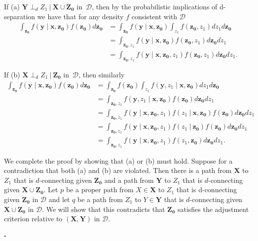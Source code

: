 \documentclass[11pt,a4paper]{article}
\newcommand{\bX}{\mathbf{X}}
\newcommand{\bY}{\mathbf{Y}}
\newcommand\given[1][]{\:#1\vert\:}
\newcommand{\dsepp}{\perp_{d}}
\newenvironment{proofof}[1][]{\begin{trivlist}
   \item[\hskip \labelsep {\bfseries Proof of #1.}]}{\hfill{}$\square$\end{trivlist}}
\newcommand{\g}[1][G]{\mathcal{#1}}
\begin{document}
\begin{proofof}[Lemma~\ref{lemma:zprime satisfies ac}]
If (a) $\mathbf{Y} \dsepp Z_1 \given \mathbf{X} \cup \mathbf{Z_0}$ in~$\g[D]$, then by the probabilistic implications of d-separation we have that for any density $f$ consistent with $\g[D]$
\begin{align}
\int_\mathbf{z_0} f(\mathbf{y} \mid \mathbf{x,z_0})f(\mathbf{z_0})d\mathbf{z_0} &= \int_\mathbf{z_0} f(\mathbf{y} \mid \mathbf{x,z_0})\int_{z_1}f(\mathbf{z_0},z_1)dz_1d\mathbf{z_0} \nonumber \\
&= \int_{\mathbf{z_0},z_1} f(\mathbf{y} \mid \mathbf{x,z_0}) f(\mathbf{z_0},z_1)d\mathbf{z_0}dz_1 \nonumber \\
&= \int_{\mathbf{z_0},z_1} f(\mathbf{y} \mid \mathbf{x,z_0},z_1)f(\mathbf{z_0},z_1)d\mathbf{z_0}dz_1. \nonumber 
\end{align}


If (b) $\mathbf{X} \dsepp Z_1 \given \mathbf{Z_0}$ in~$\g[D]$, then similarly 
\begin{align}
\int_\mathbf{z_0} f(\mathbf{y} \mid \mathbf{x,z_0})f(\mathbf{z_0})d\mathbf{z_0} &= \int_{\mathbf{z_0}}f(\mathbf{z_0})\int_{z_1} f(\mathbf{y},z_1 \mid \mathbf{x,z_0})dz_1d\mathbf{z_0} \nonumber \\
&= \int_{\mathbf{z_0},z_1} f(\mathbf{y},z_1 \mid \mathbf{x,z_0})f(\mathbf{z_0})d\mathbf{z_0}dz_1 \nonumber \\
&= \int_{\mathbf{z_0},z_1} f(\mathbf{y} \mid \mathbf{x,z_0},z_1)f(z_1 \given \mathbf{x,z_0})f(\mathbf{z_0})d\mathbf{z_0}dz_1 \nonumber \\
&= \int_{\mathbf{z_0},z_1} f(\mathbf{y} \mid \mathbf{x,z_0},z_1)f(z_1 \given \mathbf{z_0})f(\mathbf{z_0})d\mathbf{z_0}dz_1 \nonumber \\
&= \int_{\mathbf{z_0},z_1} f(\mathbf{y} \mid \mathbf{x,z_0},z_1) f(z_1, \mathbf{z_0})d\mathbf{z_0}dz_1. \nonumber 
\end{align}

We complete the proof by showing that (a) or (b) must hold.
Suppose for a contradiction that both (a) and (b) are violated. Then
there is a path from $\bX$ to $Z_1$ that is $d$-connecting given $\mathbf{Z_0}$  and a path from $\bY$ to $Z_1$
that is $d$-connecting given $\bX \cup \mathbf{Z_0}$. Let $p$ be a proper path from $X \in \mathbf{X}$ to $Z_1$ that is d-connecting given $\mathbf{Z_0}$ in $\g[D]$ and let $q$ be a path from $Z_1$ to $Y \in \mathbf{Y}$ that is $d$-connecting given $\bX \cup \mathbf{Z_0}$ in $\g[D]$.
We will show that this contradicts that $\mathbf{Z_0}$ satisfies the adjustment criterion relative to $(\mathbf{X,Y})$ in $\g[D]$.


\end{proofof}
\end{document}
